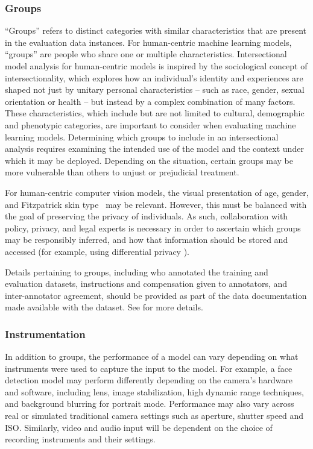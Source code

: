\subsubsection{Groups} ``Groups'' refers to distinct categories with similar characteristics that are present in the evaluation data instances. For human-centric machine learning models, ``groups'' are people who share one or multiple characteristics.  
Intersectional model analysis for human-centric models is inspired by the sociological concept of intersectionality, which explores how an individual's identity and experiences are shaped not just by unitary personal characteristics -- such as race, gender, sexual orientation or health -- but instead by a complex combination of many factors. These characteristics, which include but are not limited to cultural, demographic and phenotypic categories, are important to consider when evaluating machine learning models. Determining which groups to include in an intersectional analysis requires examining the intended use of the model and the context under which it may be deployed. Depending on the situation, certain groups may be more vulnerable than others to unjust or prejudicial treatment.

For human-centric computer vision models, the visual presentation of age, gender, and Fitzpatrick skin type~\cite{fitzpatrick} may be relevant. However, this must be balanced with the goal of preserving the privacy of individuals. As such, collaboration with policy, privacy, and legal experts is necessary in order to ascertain which groups may be responsibly inferred, and how that information should be stored and accessed (for example, using differential privacy \cite{DworkDifferential}).


Details pertaining to groups, including who annotated the training and evaluation datasets, instructions and compensation given to annotators, and inter-annotator agreement, should be provided as part of the data documentation made available with the dataset.  See \cite{GebruEtAl2018,HollandEtAl2018,statements} for more details.

\subsubsection{Instrumentation}
In addition to groups, the performance of a model can vary depending on what instruments were used to capture the input to the model. For example, a face detection model may perform differently depending on the camera's hardware and software, including lens, image stabilization, high dynamic range techniques, and background blurring for portrait mode. Performance may also vary across real or simulated traditional camera settings such as aperture, shutter speed and ISO. Similarly, video and audio input will be dependent on the choice of recording instruments and their settings. 
